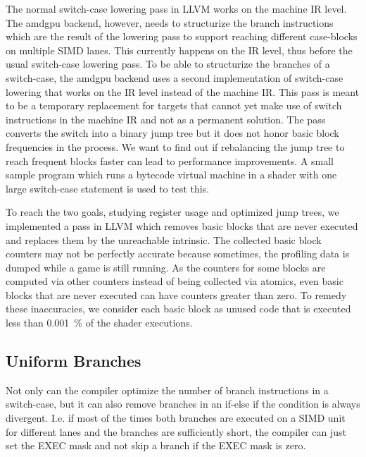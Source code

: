 The normal switch-case lowering pass in LLVM works on the machine IR level.
The amdgpu backend, however, needs to structurize the branch instructions which are the result of the lowering pass to support reaching different case-blocks on multiple SIMD lanes.
This currently happens on the IR level, thus before the usual switch-case lowering pass.
To be able to structurize the branches of a switch-case, the amdgpu backend uses a second implementation of switch-case lowering that works on the IR level instead of the machine IR.
This pass is meant to be a temporary replacement for targets that cannot yet make use of switch instructions in the machine IR and not as a permanent solution.
The pass converts the switch into a binary jump tree but it does not honor basic block frequencies in the process.
We want to find out if rebalancing the jump tree to reach frequent blocks faster can lead to performance improvements.
A small sample program which runs a bytecode virtual machine in a shader with one large switch-case statement is used to test this.

To reach the two goals, studying register usage and optimized jump trees, we implemented a pass in LLVM which removes basic blocks that are never executed and replaces them by the unreachable intrinsic.
The collected basic block counters may not be perfectly accurate because sometimes, the profiling data is dumped while a game is still running.
As the counters for some blocks are computed via other counters instead of being collected via atomics, even basic blocks that are never executed can have counters greater than zero.
To remedy these inaccuracies, we consider each basic block as unused code that is executed less than \SI{0.001}{\percent} of the shader executions.

\subsection{Uniform Branches}
\label{sub:uniformity_branch}
Not only can the compiler optimize the number of branch instructions in a switch-case, but it can also remove branches in an if-else if the condition is always divergent.
I.e. if most of the times both branches are executed on a SIMD unit for different lanes and the branches are sufficiently short, the compiler can just set the EXEC mask and not skip a branch if the EXEC mask is zero.

